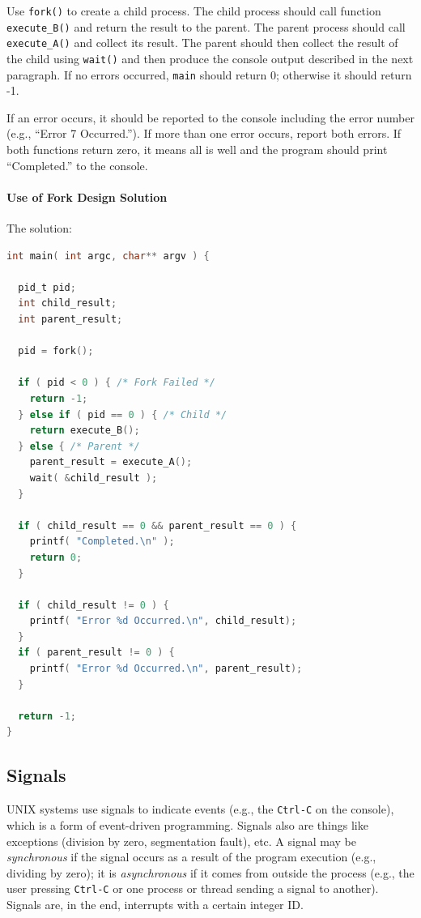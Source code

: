 Use \texttt{fork()} to create a child process. The child process should call function \texttt{execute\_B()} and return the result to the parent. The parent process should call \texttt{execute\_A()} and collect its result. The parent should then collect the result of the child using \texttt{wait()} and then produce the console output described in the next paragraph. If no errors occurred, \texttt{main} should return 0; otherwise it should return -1.

If an error occurs, it should be reported to the console including the error number (e.g., ``Error 7 Occurred.''). If more than one error occurs, report both errors. If both functions return zero, it means all is well and the program should print ``Completed.'' to the console.

\paragraph{Use of Fork Design Solution} The solution:

\begin{lstlisting}[language=C]
int main( int argc, char** argv ) {

  pid_t pid;
  int child_result;
  int parent_result;

  pid = fork();
  
  if ( pid < 0 ) { /* Fork Failed */
    return -1;
  } else if ( pid == 0 ) { /* Child */
    return execute_B();
  } else { /* Parent */ 
    parent_result = execute_A();
    wait( &child_result );
  }
  
  if ( child_result == 0 && parent_result == 0 ) {
    printf( "Completed.\n" );
    return 0;
  }
  
  if ( child_result != 0 ) {
    printf( "Error %d Occurred.\n", child_result);
  }
  if ( parent_result != 0 ) {
    printf( "Error %d Occurred.\n", parent_result);
  }
  
  return -1;
}
\end{lstlisting}


\subsection*{Signals} 

UNIX systems use signals to indicate events (e.g., the \texttt{Ctrl-C} on the console), which is a form of event-driven programming. Signals also are things like exceptions (division by zero, segmentation fault), etc. A signal may be \textit{synchronous} if the signal occurs as a result of the program execution (e.g., dividing by zero); it is \textit{asynchronous} if it comes from outside the process (e.g., the user pressing \texttt{Ctrl-C} or one process or thread sending a signal to another). Signals are, in the end, interrupts with a certain integer ID.


